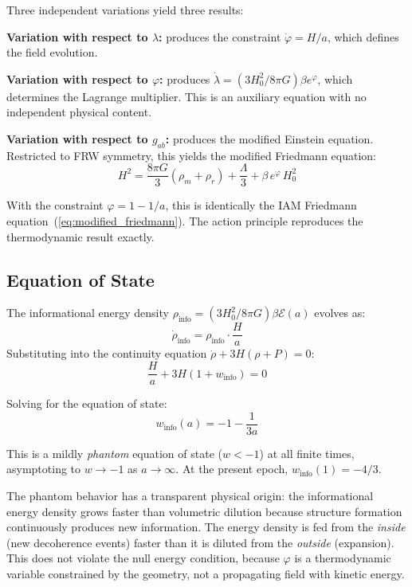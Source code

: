 \documentclass[aps,prd,twocolumn,superscriptaddress,nofootinbib]{revtex4-2}
\begin{document}
Three independent variations yield three results:

\textbf{Variation with respect to $\lambda$:} produces the constraint $\dot{\varphi} = H/a$, which defines the field evolution.

\textbf{Variation with respect to $\varphi$:} produces $\dot{\lambda} = (3H_0^2/8\pi G)\beta e^{\varphi}$, which determines the Lagrange multiplier. This is an auxiliary equation with no independent physical content.

\textbf{Variation with respect to $g_{ab}$:} produces the modified Einstein equation. Restricted to FRW symmetry, this yields the modified Friedmann equation:
\begin{equation}
H^2 = \frac{8\pi G}{3}\left(\rho_m + \rho_r\right) + \frac{\Lambda}{3} + \beta\,e^{\varphi}\,H_0^2
\end{equation}

With the constraint $\varphi = 1 - 1/a$, this is identically the IAM Friedmann equation~(\ref{eq:modified_friedmann}). The action principle reproduces the thermodynamic result exactly.

\subsection{Equation of State}

The informational energy density $\rho_\text{info} = (3H_0^2/8\pi G)\beta\mathcal{E}(a)$ evolves as:
\begin{equation}
\dot{\rho}_\text{info} = \rho_\text{info}\cdot\frac{H}{a}
\end{equation}
Substituting into the continuity equation $\dot{\rho} + 3H(\rho + P) = 0$:
\begin{equation}
\frac{H}{a} + 3H(1 + w_\text{info}) = 0
\end{equation}

Solving for the equation of state:
\begin{equation}
\boxed{w_\text{info}(a) = -1 - \frac{1}{3a}}
\label{eq:w_info}
\end{equation}

This is a mildly \textit{phantom} equation of state ($w < -1$) at all finite times, asymptoting to $w \to -1$ as $a \to \infty$. At the present epoch, $w_\text{info}(1) = -4/3$.

The phantom behavior has a transparent physical origin: the informational energy density grows faster than volumetric dilution because structure formation continuously produces new information. The energy density is fed from the \textit{inside} (new decoherence events) faster than it is diluted from the \textit{outside} (expansion). This does not violate the null energy condition, because $\varphi$ is a thermodynamic variable constrained by the geometry, not a propagating field with kinetic energy.
\end{document}
